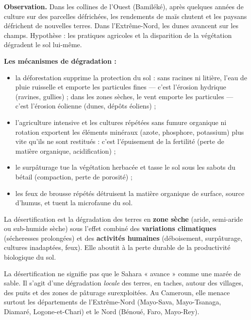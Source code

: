 \documentclass[11pt]{article}
\newcommand{\cle}[1]{{\popxbold\color{popdark}#1}}
\newcounter{popsec}
\newcounter{popsub}
\newcommand{\courssub}[1]{%
  \stepcounter{popsub}%
  \par\vspace{9pt}\noindent{\popxbold\fontsize{11.5}{13}\selectfont\color{popink}{\color{poporange}\thepopsec.\thepopsub}\hspace{6pt}#1}\par\nopagebreak\vspace{4pt}
}
\begin{document}
\courssub{Les pressions sur les sols}

\textbf{Observation.} Dans les collines de l'Ouest (Bamiléké), après quelques années de culture sur des parcelles défrichées, les rendements de maïs chutent et les paysans défrichent de nouvelles terres. Dans l'Extrême-Nord, les dunes avancent sur les champs. Hypothèse : les pratiques agricoles et la disparition de la végétation dégradent le sol lui-même.

\textbf{Les mécanismes de dégradation :}
\begin{itemize}
  \item la \cle{déforestation} supprime la protection du sol : sans racines ni litière, l'eau de pluie ruisselle et emporte les particules fines — c'est l'\cle{érosion hydrique} (ravines, gullies) ; dans les zones sèches, le vent emporte les particules — c'est l'\cle{érosion éolienne} (dunes, dépôts éoliens) ;
  \item l'\cle{agriculture intensive} et les cultures répétées sans fumure organique ni rotation exportent les éléments minéraux (azote, phosphore, potassium) plus vite qu'ils ne sont restitués : c'est l'\cle{épuisement de la fertilité} (perte de matière organique, acidification) ;
  \item le \cle{surpâturage} tue la végétation herbacée et tasse le sol sous les sabots du bétail (compaction, perte de porosité) ;
  \item les \cle{feux de brousse} répétés détruisent la matière organique de surface, source d'humus, et tuent la microfaune du sol.
\end{itemize}

\begin{definition}[Désertification]
La \cle{désertification} est la dégradation des terres en \textbf{zone sèche} (aride, semi-aride ou sub-humide sèche) sous l'effet combiné des \textbf{variations climatiques} (sécheresses prolongées) et des \textbf{activités humaines} (déboisement, surpâturage, cultures inadaptées, feux). Elle aboutit à la perte durable de la productivité biologique du sol.
\end{definition}

\begin{attention}
La désertification ne signifie pas que le Sahara « avance » comme une marée de sable. Il s'agit d'une dégradation \emph{locale} des terres, en taches, autour des villages, des puits et des zones de pâturage surexploitées. Au Cameroun, elle menace surtout les départements de l'Extrême-Nord (Mayo-Sava, Mayo-Tsanaga, Diamaré, Logone-et-Chari) et le Nord (Bénoué, Faro, Mayo-Rey).
\end{attention}
\end{document}
